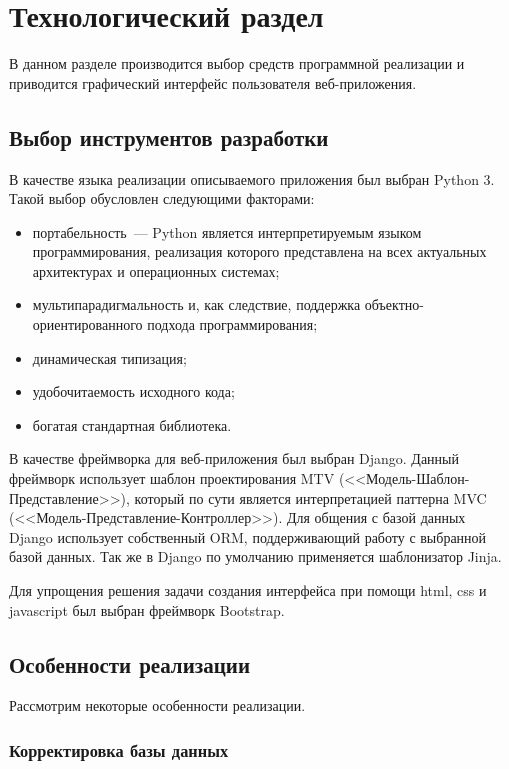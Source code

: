 \chapter{Технологический раздел}%
\label{cha:tekhnologicheskii_razdel}

В данном разделе производится выбор средств программной реализации и приводится графический интерфейс пользователя веб-приложения.

\section{Выбор инструментов разработки}%
\label{sec:vybor_instrumentov_razrabotki}

В качестве языка реализации описываемого приложения был выбран Python 3. Такой выбор обусловлен следующими факторами:
\begin{itemize}
    \item портабельность~--- Python является интерпретируемым языком программирования, реализация которого представлена на всех актуальных архитектурах и операционных системах;
    \item мультипарадигмальность и, как следствие, поддержка объектно-ориентированного подхода программирования;
    \item динамическая типизация;
    \item удобочитаемость исходного кода;
    \item богатая стандартная библиотека.
\end{itemize}

В качестве фреймворка для веб-приложения был выбран Django. Данный фреймворк использует шаблон проектирования MTV (<<Модель-Шаблон-Представление>>), который по сути является интерпретацией паттерна MVC (<<Модель-Представление-Контроллер>>). Для общения с базой данных Django использует собственный ORM, поддерживающий работу с выбранной базой данных. Так же в Django по умолчанию применяется шаблонизатор Jinja.

Для упрощения решения задачи создания интерфейса при помощи html, css и javascript был выбран фреймворк Bootstrap.

\section{Особенности реализации}%
\label{sec:osobennosti_realizatsii}

Рассмотрим некоторые особенности реализации.

\subsection{Корректировка базы данных}%
\label{sub:korrektirovka_bazy_dannykh}

